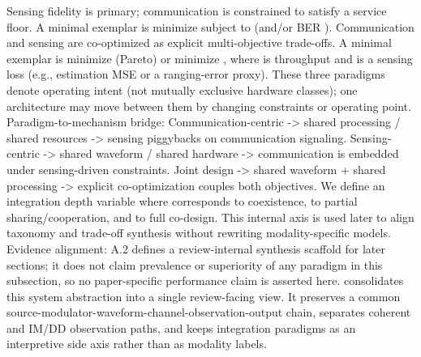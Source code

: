 {} Sensing fidelity is primary; communication is constrained to satisfy a service floor. A minimal exemplar is minimize  subject to  (and/or BER \markdownRendererInlineMath{\le \beta}).\markdownRendererParagraphSeparator
{} Communication and sensing are co-optimized as explicit multi-objective trade-offs. A minimal exemplar is minimize  (Pareto) or minimize , where  is throughput and  is a sensing loss (e.g., estimation MSE or a ranging-error proxy).\markdownRendererParagraphSeparator
{}These three paradigms denote operating intent (not mutually exclusive hardware classes); one architecture may move between them by changing constraints or operating point.\markdownRendererParagraphSeparator
{}Paradigm-to-mechanism bridge:\markdownRendererInterblockSeparator
{}\markdownRendererUlBeginTight
\markdownRendererUlItem Communication-centric -> shared processing / shared resources -> sensing piggybacks on communication signaling.\markdownRendererUlItemEnd 
\markdownRendererUlItem Sensing-centric -> shared waveform / shared hardware -> communication is embedded under sensing-driven constraints.\markdownRendererUlItemEnd 
\markdownRendererUlItem Joint design -> shared waveform + shared processing -> explicit co-optimization couples both objectives.\markdownRendererUlItemEnd 
\markdownRendererUlEndTight \markdownRendererInterblockSeparator
{}We define an integration depth variable\markdownRendererSoftLineBreak
{}\markdownRendererSoftLineBreak
{}where  corresponds to coexistence,  to partial sharing/cooperation, and  to full co-design. This internal axis is used later to align taxonomy and trade-off synthesis without rewriting modality-specific models.\markdownRendererParagraphSeparator
{}Evidence alignment: A.2 defines a review-internal synthesis scaffold for later sections; it does not claim prevalence or superiority of any paradigm in this subsection, so no paper-specific performance claim is asserted here.\markdownRendererParagraphSeparator
{} consolidates this system abstraction into a single review-facing view. It preserves a common source-modulator-waveform-channel-observation-output chain, separates coherent and IM/DD observation paths, and keeps integration paradigms as an interpretive side axis rather than as modality labels.\markdownRendererParagraphSeparator
